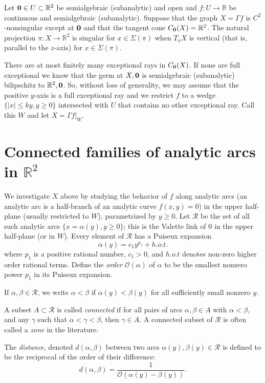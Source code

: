 \documentclass[article]{amsart}
\newcommand{\R}{\mathbb R}
\newcommand{\0}{{\bf 0}}
\begin{document}
Let $\0 \in U \subset \R^2$ be semialgebraic (subanalytic) and open and $f:U \rightarrow \R$  be continuous and semialgebraic (subanalytic).  Suppose that the graph $X = \Gamma f$ is $C^2$-nonsingular except at $\0$ and that 
the tangent cone $C_\0 (X) = \R^2$.  The natural projection $\pi : X \rightarrow \R^2$ is singular for $x \in \Sigma (\pi)$ when $T_xX$ is vertical (that is, parallel to the $z$-axis) for $x\in \Sigma(\pi)$.

There are at most finitely many exceptional rays in $C_\0(X)$.  If none are full exceptional we know that
the germ at $X, \0$ is semialgebraic (subanalytic) bilipschitz to $\R^2, \0$. So, without loss of generality, we may assume that the positive $y$-axis is a full exceptional ray and we restrict $f$ to a wedge $\{ |x|\le ky, y\ge 0 \} $ intersected with $U$ that contains no other exceptional ray.  Call this $W$ and let
$X= \Gamma f|_W$.  %

\section{Connected families of analytic arcs in $\R^2$}

We investigate $X$ above by studying the behavior of $f$ along analytic arcs (an analytic arc is a half-branch of an analytic curve $f(x,y)=0$) in the upper half-plane (usually restricted to $W$), parametrized by $ y\ge 0$.
Let $\mathcal{R}$ be the set of all such analytic arcs $\{x=\alpha(y), y\ge 0\}$; this is the Valette link of $0$ in the upper half-plane (or in $W$). Every element of $\mathcal{R}$ has a Puiseux expansion
$$\alpha(y) = c_1y^{p_1} + h.o.t.$$
where $p_1$ is a positive rational 
number, $c_1>0$, and $h.o.t$ denotes non-zero higher order rational 
terms.  
Define the {\it order} 
$\mathcal{O}(\alpha)$ of $\alpha$ to be the smallest nonzero power $p_1$ in its Puiseux expansion.

     

If $\alpha, \beta \in \mathcal{R}$, we write $\alpha < \beta$ if $\alpha(y) < \beta(y)$ for all sufficiently small nonzero $y$.  

A subset $A\subset \mathcal{R}$ is called {\it connected} if for all pairs of arcs $\alpha, \beta \in A$ with $\alpha < \beta$, and any 
$\gamma$ such that $\alpha < \gamma <\beta$, then $\gamma \in A$.  A connected subset of $\mathcal{R}$ is often called a {\it zone} in the literature.  

The {\it distance}, denoted $d(\alpha, \beta)$ between two arcs $\alpha(y), \beta(y) \in \mathcal{R}$ is defined to be the reciprocal of the order of their difference:
$$
 d(\alpha, \beta) = \frac{1}{\mathcal{O}(\alpha(y) - \beta(y))}.
 $$
\end{document}
